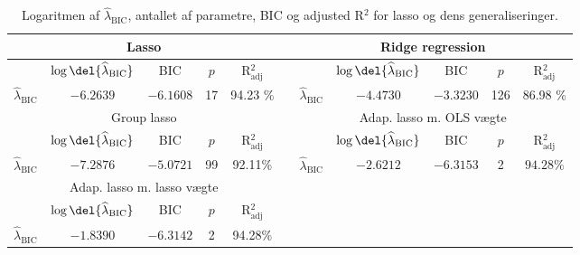 
\begin{table}
\center
\begin{tabular}{lcccc  | lccccc} 
\toprule
 \multicolumn{5}{c}{Lasso} && \multicolumn{5}{c}{Ridge regression}  \\ \midrule
& $\log \del{\widehat{\lambda}_\text{BIC}}$  & BIC & $p$ & R$^2_{\text{adj}}$ && & $\log \del{\widehat{\lambda}_\text{BIC}}$  &  BIC & $p$ &R$^2_{\text{adj}}$  \\
$\widehat{\lambda}_\text{BIC} $&  $-6.2639$ & $-6.1608$ & 17 &  94.23 \% && $\widehat{\lambda}_\text{BIC} $ & $-4.4730$ & $-3.3230$ &  126 & 86.98 \% \\ \bottomrule \toprule 
 \multicolumn{5}{c}{Group lasso} && \multicolumn{5}{c}{Adap. lasso m. OLS vægte}  \\ \midrule
& $\log \del{\widehat{\lambda}_\text{BIC}}$  & BIC & $p$ &R$^2_{\text{adj}}$ && & $\log \del{\widehat{\lambda}_\text{BIC}}$  &  BIC & $p$ &R$^2_{\text{adj}}$   \\
$\widehat{\lambda}_\text{BIC}$ & $-7.2876$ &  $-5.0721$ &99  & 92.11\% &&  $\widehat{\lambda}_\text{BIC}$ & $-2.6212$ &  $-6.3153$  & 2 & $94.28 \%$ \\ \bottomrule \toprule 
 \multicolumn{5}{c}{Adap. lasso m. lasso vægte}  \\
& $\log \del{\widehat{\lambda}_\text{BIC}}$  & BIC & $p$ & R$^2_{\text{adj}}$\\
 $\widehat{\lambda}_\text{BIC}  $&  	$-1.8390$ & $-6.3142$  & 2& 94.28\% \\ \cmidrule{1-5}
 \end{tabular}
\caption{Logaritmen af $\widehat{\lambda}_\text{BIC}$, antallet af parametre, BIC og adjusted R$^2$ for lasso og dens generaliseringer.} \label{tab:bic_lambda}
\end{table}